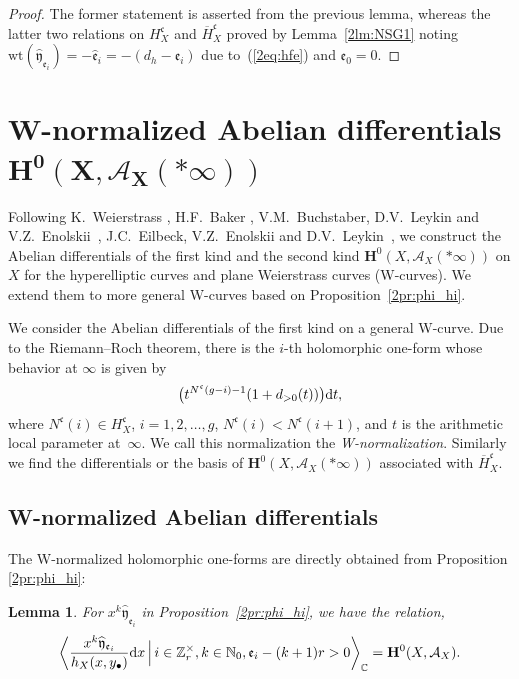 \documentclass[10pt,a4paper]{amsart}
\def\CC{{\mathbb C}}
\def\ZZ{{\mathbb Z}}
\def\NN{{\mathbb N}}
\def\bH{{\mathbf F}}
\def\bH{{\mathbf H}}
\def\cA{{\mathcal A}}
\def\fc{{\mathfrak c}}
\def\fe{{\mathfrak e}}
\def\BH{{\overline H}}
\def\hfe{{\widehat{\mathfrak e}}}
\def\hfy{{\widehat{\mathfrak y}}}
\def\wt{{\mathrm {wt}}}
\numberwithin{equation}{section}
\newtheorem{Lemma}[Theorem]{Lemma}
\begin{document}
\begin{proof}The former statement is asserted from the previous lemma, whereas the latter two relations on $H_X^\fc$ and $\BH_X^\fc$ proved by Lemma~\ref{2lm:NSG1} noting $\wt(\hfy_{\fe_i})=-\hfe_i=-(d_h-\fe_i)$ due to~(\ref{2eq:hfe}) and $\fe_0 =0$.
\end{proof}

\section[W-normalized Abelian differentials H\^{}0(X,A\_X(*infty))]{W-normalized Abelian differentials $\boldsymbol{\bH^0(X, \cA_X(*\infty))}$}\label{2ssc:W-norm_nuI}

Following K.~Weierstrass \cite{WeiWIV},
H.F.~Baker \cite{Baker97}, V.M.~Buchstaber, D.V.~Leykin and V.Z.~Enolskii~\cite{BEL20}, J.C.~Eilbeck, V.Z.~Enolskii and D.V.~Leykin~\cite{EEL00}, we construct the Abelian differentials of the first kind and the second kind $\bH^0(X, \cA_X(*\infty))$ on $X$ for the hyperelliptic curves and plane Weierstrass curves (W-curves).
We extend them to more general W-curves based on Proposition~\ref{2pr:phi_hi}.

We consider the Abelian differentials of the first kind on a general W-curve.
Due to the Riemann--Roch theorem, there is the $i$-th holomorphic one-form
whose behavior at $\infty$ is given by
\begin{equation*}
 \bigr(t^{N^\fc(g-i)-1} (1+ d_{>0}(t))\bigr) {\rm d} t,%
\end{equation*}
where $N^\fc(i) \in H_X^\fc$, $i=1, 2, \dots, g$, $N^\fc(i) <N^\fc(i+1)$, and $t$ is the arithmetic local parameter at~$\infty$.
We call this normalization the {\emph{W-normalization}}.
Similarly we find the differentials or the basis of $\bH^0(X, \cA_X(*\infty))$ associated with $\BH_X^\fc$.

\subsection{W-normalized Abelian differentials}

The W-normalized holomorphic one-forms are directly obtained from Proposition \ref{2pr:phi_hi}:
\begin{Lemma}\label{2lm:hphi_hi}
For $x^k \hfy_{\fe_i}$ in Proposition~{\rm \ref{2pr:phi_hi}}, we have the relation,
\[
\left\langle\frac{x^k\hfy_{\fe_i}}{h_X(x,y_\bullet)}{\rm d} x \, \Bigr|
\, i \in \ZZ_r^\times, k\in \NN_0, \fe_{i}-(k+1)r>0 \right\rangle_\CC
= \bH^0(X, \cA_X).
\]
\end{Lemma}
\end{document}
